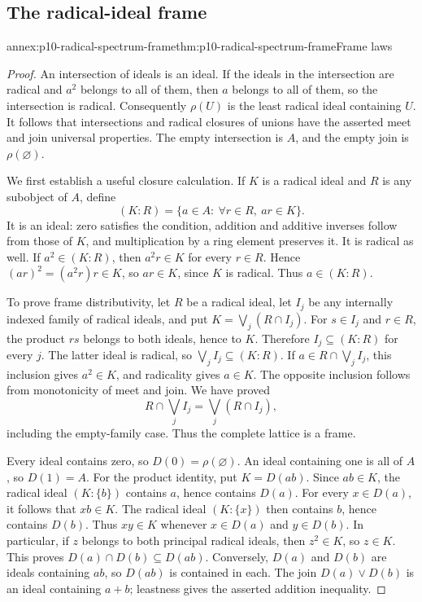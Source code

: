 \subsection{The radical-ideal frame}
\label{sec:annex-p10-radical-ideal-spectrum}

\begin{annexitem}{annex:p10-radical-spectrum-frame}{thm:p10-radical-spectrum-frame}{Frame laws}
\begin{proof}
An intersection of ideals is an ideal. If the ideals in the intersection
are radical and \(a^2\) belongs to all of them, then \(a\) belongs to
all of them, so the intersection is radical.
Consequently \(\rho(U)\) is the least radical ideal containing \(U\).
It follows that intersections and radical closures of unions have
the asserted meet and join universal properties. The empty intersection
is \(A\), and the empty join is \(\rho(\varnothing)\).

We first establish a useful closure calculation. If \(K\) is a
radical ideal and \(R\) is any subobject of \(A\), define
\[
 (K:R)=\{a\in A:\ \forall r\in R,\ ar\in K\}.
\]
It is an ideal: zero satisfies the condition, addition and additive
inverses follow from those of \(K\), and multiplication by a ring
element preserves it. It is radical as well. If \(a^2\in(K:R)\),
then \(a^2r\in K\) for every \(r\in R\). Hence
\((ar)^2=(a^2r)r\in K\), so \(ar\in K\), since \(K\) is radical.
Thus \(a\in(K:R)\).

To prove frame distributivity, let \(R\) be a radical ideal,
let \(I_j\) be any internally indexed family of radical ideals,
and put \(K=\bigvee_j(R\cap I_j)\).
For \(s\in I_j\) and \(r\in R\), the product \(rs\) belongs
to both ideals, hence to \(K\).
Therefore \(I_j\subseteq(K:R)\) for every \(j\).
The latter ideal is radical, so \(\bigvee_j I_j\subseteq(K:R)\).
If \(a\in R\cap\bigvee_j I_j\), this inclusion gives \(a^2\in K\),
and radicality gives \(a\in K\).
The opposite inclusion follows from monotonicity of meet and join.
We have proved
\[
 R\cap\bigvee_j I_j=\bigvee_j(R\cap I_j),
\]
including the empty-family case. Thus the complete lattice is a frame.

Every ideal contains zero, so \(D(0)=\rho(\varnothing)\).
An ideal containing one is all of \(A\), so \(D(1)=A\).
For the product identity, put \(K=D(ab)\).
Since \(ab\in K\), the radical ideal \((K:\{b\})\) contains
\(a\), hence contains \(D(a)\).
For every \(x\in D(a)\), it follows that \(xb\in K\).
The radical ideal \((K:\{x\})\) then contains \(b\), hence
contains \(D(b)\).
Thus \(xy\in K\) whenever \(x\in D(a)\) and \(y\in D(b)\).
In particular, if \(z\) belongs to both principal radical ideals,
then \(z^2\in K\), so \(z\in K\).
This proves \(D(a)\cap D(b)\subseteq D(ab)\).
Conversely, \(D(a)\) and \(D(b)\) are ideals containing \(ab\),
so \(D(ab)\) is contained in each.
The join \(D(a)\vee D(b)\) is an ideal containing \(a+b\);
leastness gives the asserted addition inequality.


\end{proof}
\end{annexitem}
